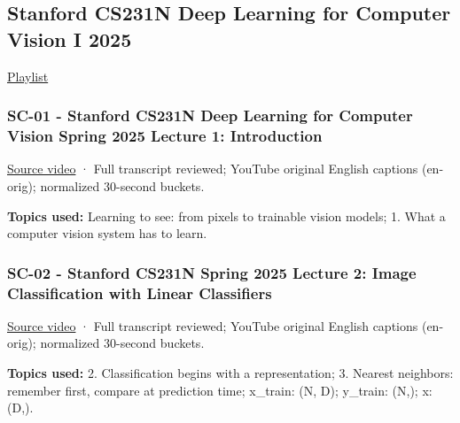\subsection{Stanford CS231N Deep Learning for Computer Vision I 2025}\label{04-visual-computing-ii-ch036-stanford-cs231n-deep-learning-for-computer-vision-i-2025}

\hypertarget{04-visual-computing-ii-ch036-stanford-cs231n-deep-learning-for-computer-vision-i-2025}{}

\href{https://www.youtube.com/playlist?list=PLoROMvodv4rOmsNzYBMe0gJY2XS8AQg16}{Playlist}

\subsubsection{SC-01 - Stanford CS231N Deep Learning for Computer Vision Spring 2025 Lecture 1: Introduction}\label{04-visual-computing-ii-ch036-sc-01---stanford-cs231n-deep-learning-for-computer-vision-spring-2025-lecture-1-introduction}

\hypertarget{04-visual-computing-ii-ch036-sc-01---stanford-cs231n-deep-learning-for-computer-vision-spring-2025-lecture-1-introduction}{}

\href{https://www.youtube.com/watch?v=2fq9wYslV0A}{Source video} · Full transcript reviewed; YouTube original English captions (en-orig); normalized 30-second buckets.

\textbf{Topics used:} Learning to see: from pixels to trainable vision models; 1. What a computer vision system has to learn.

\subsubsection{SC-02 - Stanford CS231N Spring 2025 Lecture 2: Image Classification with Linear Classifiers}\label{04-visual-computing-ii-ch036-sc-02---stanford-cs231n-spring-2025-lecture-2-image-classification-with-linear-classifiers}

\hypertarget{04-visual-computing-ii-ch036-sc-02---stanford-cs231n-spring-2025-lecture-2-image-classification-with-linear-classifiers}{}

\href{https://www.youtube.com/watch?v=pdqofxJeBN8}{Source video} · Full transcript reviewed; YouTube original English captions (en-orig); normalized 30-second buckets.

\textbf{Topics used:} 2. Classification begins with a representation; 3. Nearest neighbors: remember first, compare at prediction time; x\_train: (N, D); y\_train: (N,); x: (D,).

